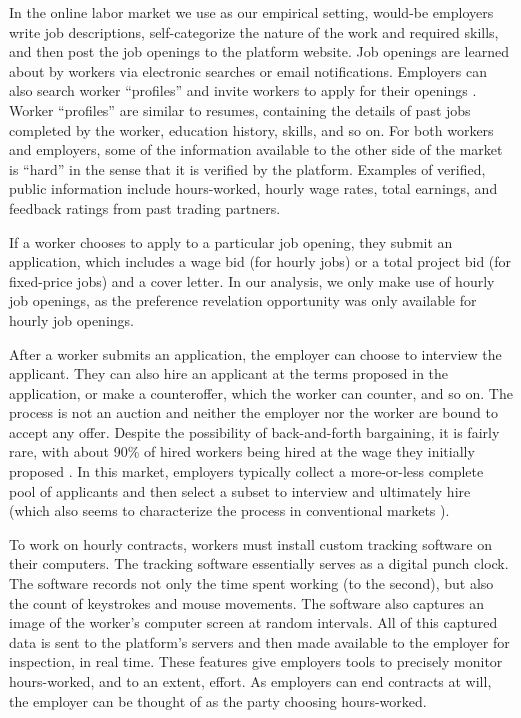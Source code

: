 \documentclass[12pt]{article}
\begin{document}
In the online labor market we use as our empirical setting, would-be employers write job descriptions, self-categorize the nature of the work and required skills, and then post the job openings to the platform website.
Job openings are learned about by workers via electronic searches or email notifications.
Employers can also search worker ``profiles'' and invite workers to apply for their openings \citep{horton2017effects}.
Worker ``profiles''  are similar to resumes, containing the details of past jobs completed by the worker, education history, skills, and so on.
For both workers and employers, some of the information available to the other side of the market is ``hard'' in the sense that it is verified by the platform.
Examples of verified, public information include hours-worked, hourly wage rates, total earnings, and feedback ratings from past trading partners.

If a worker chooses to apply to a particular job opening, they submit an application, which includes a wage bid (for hourly jobs) or a total project bid (for fixed-price jobs) and a cover letter.
In our analysis, we only make use of hourly job openings, as the preference revelation opportunity was only available for hourly job openings. 

After a worker submits an application, the employer can choose to interview the applicant.
They can also hire an applicant at the terms proposed in the application, or make a counteroffer, which the worker can counter, and so on.
The process is not an auction and neither the employer nor the worker are bound to accept any offer. 
Despite the possibility of back-and-forth bargaining, it is fairly rare, with about 90\% of hired workers being hired at the wage they initially proposed \citep{barach2016info}.
In this market, employers typically collect a more-or-less complete pool of applicants and then select a subset to interview and ultimately hire (which also seems to characterize the process in conventional markets \citep{davis2021}).

To work on hourly contracts, workers must install custom tracking software on their computers. 
The tracking software essentially serves as a digital punch clock.
The software records not only the time spent working (to the second), but also the count of keystrokes and mouse movements.
The software also captures an image of the worker's computer screen at random intervals.
All of this captured data is sent to the platform's servers and then made available to the employer for inspection, in real time.
These features give employers tools to precisely monitor hours-worked, and to an extent, effort.
As employers can end contracts at will, the employer can be thought of as the party choosing hours-worked.
\end{document}
